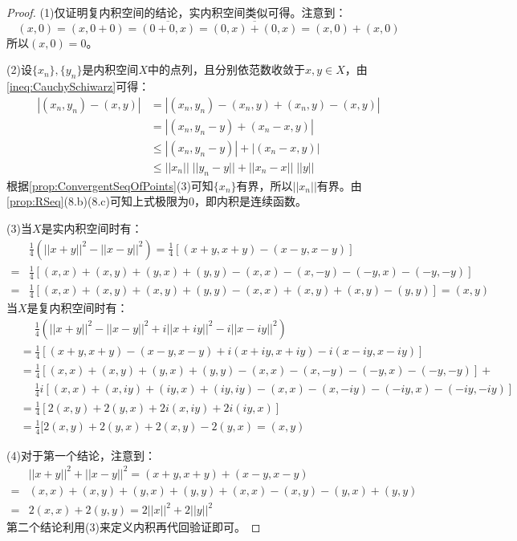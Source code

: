 \begin{proof}
	(1)仅证明复内积空间的结论，实内积空间类似可得。注意到：
	\begin{equation*}
		(x,0)=(x,0+0)=\overline{(0+0,x)}=\overline{(0,x)+(0,x)}=(x,0)+(x,0)
	\end{equation*}
	所以$(x,0)=0$。\par
	(2)设$\{x_n\},\{y_n\}$是内积空间$X$中的点列，且分别依范数收敛于$x,y\in X$，由\cref{ineq:CauchySchiwarz}可得：
	\begin{align*}
		|(x_n,y_n)-(x,y)|&=|(x_n,y_n)-(x_n,y)+(x_n,y)-(x,y)| \\
		&=|(x_n,y_n-y)+(x_n-x,y)| \\
		&\leqslant|(x_n,y_n-y)|+|(x_n-x,y)| \\
		&\leqslant||x_n||\;||y_n-y||+||x_n-x||\;||y|| 
	\end{align*}
	根据\cref{prop:ConvergentSeqOfPoints}(3)可知$\{x_n\}$有界，所以$||x_n||$有界。由\cref{prop:RSeq}(8.b)(8.c)可知上式极限为$0$，即内积是连续函数。\par
	(3)当$X$是实内积空间时有：
	\begin{align*}
		&\frac{1}{4}(||x+y||^2-||x-y||^2)=\frac{1}{4}[(x+y,x+y)-(x-y,x-y)] \\
		=&\frac{1}{4}[(x,x)+(x,y)+(y,x)+(y,y)-(x,x)-(x,-y)-(-y,x)-(-y,-y)] \\
		=&\frac{1}{4}[(x,x)+(x,y)+(x,y)+(y,y)-(x,x)+(x,y)+(x,y)-(y,y)]=(x,y)
	\end{align*}
	当$X$是复内积空间时有：
	\begin{align*}
		&\quad\;\frac{1}{4}(||x+y||^2-||x-y||^2+i||x+iy||^2-i||x-iy||^2) \\
		&=\frac{1}{4}[(x+y,x+y)-(x-y,x-y)+i(x+iy,x+iy)-i(x-iy,x-iy)] \\
		&=\frac{1}{4}[(x,x)+(x,y)+(y,x)+(y,y)-(x,x)-(x,-y)-(-y,x)-(-y,-y)]+ \\
		&\quad\;\frac{1}{4}i[(x,x)+(x,iy)+(iy,x)+(iy,iy)-(x,x)-(x,-iy)-(-iy,x)-(-iy,-iy)] \\
		&=\frac{1}{4}[2(x,y)+2(y,x)+2i(x,iy)+2i(iy,x)] \\
		&=\frac{1}{4}[2(x,y)+2(y,x)+2(x,y)-2(y,x)=(x,y)
	\end{align*}\par
	(4)对于第一个结论，注意到：
	\begin{align*}
		&||x+y||^2+||x-y||^2=(x+y,x+y)+(x-y,x-y) \\
		=&(x,x)+(x,y)+(y,x)+(y,y)+(x,x)-(x,y)-(y,x)+(y,y) \\
		=&2(x,x)+2(y,y)=2||x||^2+2||y||^2
	\end{align*}
	第二个结论利用(3)来定义内积再代回验证即可。
\end{proof}
